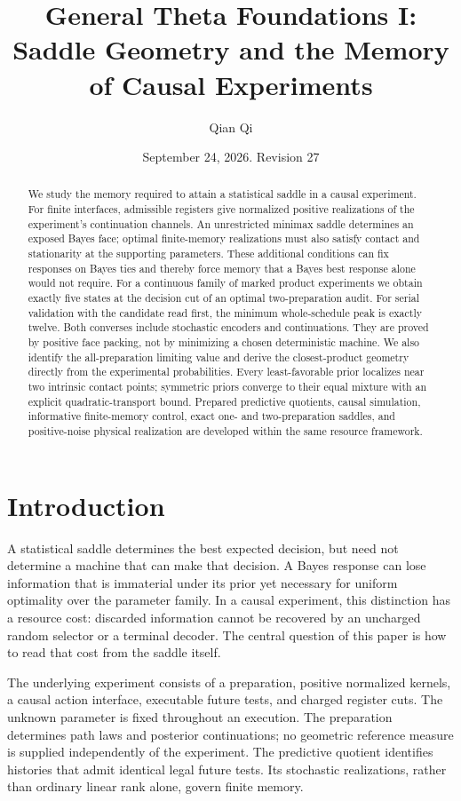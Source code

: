 \documentclass[11pt]{amsart}
\title[Saddle geometry and causal memory]{General Theta Foundations I:\\
Saddle Geometry and the Memory of Causal Experiments}
\author{Qian Qi}
\date{September 24, 2026. Revision 27}
\theoremstyle{definition}\newtheorem{definition}[theorem]{Definition}
\theoremstyle{remark}\newtheorem{remark}[theorem]{Remark}
\newcommand{\1}{\mathbf 1}
\begin{document}
\begin{abstract}
We study the memory required to attain a statistical saddle in a causal
experiment. For finite interfaces, admissible registers give normalized
positive realizations of the experiment's continuation channels. An
unrestricted minimax saddle determines an exposed Bayes face; optimal
finite-memory realizations must also satisfy contact and stationarity
at the supporting parameters. These additional conditions can fix
responses on Bayes ties and thereby force memory that a Bayes best
response alone would not require. For a continuous family of marked
product experiments we obtain exactly five states at the decision cut
of an optimal two-preparation audit. For serial validation with the
candidate read first, the minimum whole-schedule peak is exactly twelve.
Both converses include stochastic encoders and continuations. They are
proved by positive face packing, not by minimizing a chosen deterministic
machine. We also identify the all-preparation limiting value and derive
the closest-product geometry directly from the experimental probabilities.
Every least-favorable prior localizes near two intrinsic contact points;
symmetric priors converge to their equal mixture with an explicit
quadratic-transport bound. Prepared predictive quotients, causal
simulation, informative finite-memory control, exact one- and
two-preparation saddles, and positive-noise physical realization are
developed within the same resource framework.
\end{abstract}
\maketitle
\tableofcontents

\section{Introduction}
A statistical saddle determines the best expected decision, but need not
determine a machine that can make that decision. A Bayes response can
lose information that is immaterial under its prior yet necessary for
uniform optimality over the parameter family. In a causal experiment,
this distinction has a resource cost: discarded information cannot be
recovered by an uncharged random selector or a terminal decoder.
The central question of this paper is how to read that cost from the
saddle itself.

The underlying experiment consists of a preparation, positive normalized
kernels, a causal action interface, executable future tests, and charged
register cuts. The unknown parameter is fixed throughout an execution.
The preparation determines path laws and posterior continuations; no
geometric reference measure is supplied independently of the experiment.
The predictive quotient identifies histories that admit identical legal
future tests. Its stochastic realizations, rather than ordinary linear
rank alone, govern finite memory.
\end{document}

